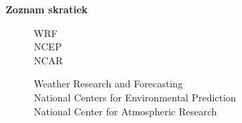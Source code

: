 \eject
\begin{Huge}
\noindent\textbf{Zoznam skratiek} 
\end{Huge}


\begin{figure}[!h]
		\bigskip
		\bigskip
		\hspace{0.5cm}
		\begin{minipage}[h]{0.1\textwidth}
		  WRF \\
		  NCEP \\
		  NCAR \\
		\end{minipage}
		\begin{minipage}[h]{0.8\textwidth}
		  Weather Research and Forecasting \\
		  National Centers for Environmental Prediction \\
		  National Center for Atmospheric Research \\
		  \end{minipage}
	\end{figure}